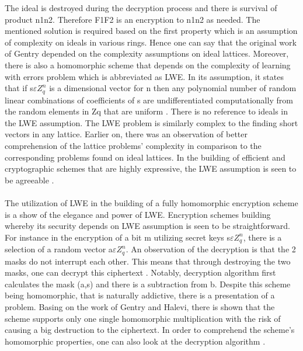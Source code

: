 The ideal is destroyed during the decryption process and there is survival of product n1n2. Therefore F1F2  is an encryption to  n1n2 as needed. The mentioned solution is required based on the first property which is an assumption of complexity on ideals in various rings. Hence one can say that the original work of Gentry depended on the complexity assumptions on ideal lattices. Moreover, there is also a homomorphic scheme that depends on the complexity of learning with errors problem which is abbreviated as LWE. In its assumption, it states that if s$\varepsilon Z_{q}^{n}$ is a dimensional vector for n then any polynomial number of random linear combinations of coefficients of s are undifferentiated computationally from the random elements in Zq that are uniform \cite{brakerski2011fully}. There is no reference to ideals in the LWE assumption. The LWE problem is similarly complex to the finding short vectors in any lattice. Earlier on, there was an observation of better comprehension of the lattice problems’ complexity in comparison to the corresponding problems found on ideal lattices. In the building of efficient and cryptographic schemes that are highly expressive, the LWE assumption is seen to be agreeable \cite{brakerski2011fully}. \\\\
The utilization of LWE in the building of a fully homomorphic encryption scheme is a show of the elegance and power of LWE. Encryption schemes building whereby its security depends on LWE assumption is seen to be straightforward. For instance in the encryption of a bit m utilizing secret keys s$\varepsilon Z_{q}^{n}$, there is a selection of a random vector a$\varepsilon Z_{q}^{n}$. An observation of the decryption is that the 2 masks do not interrupt each other. This means that through destroying the two masks, one can decrypt this ciphertext \cite{brakerski2011fully}. Notably, decryption algorithm first calculates the mask (a,s) and there is a subtraction from b. Despite this scheme being homomorphic, that is naturally addictive, there is a presentation of a problem. Basing on the work of Gentry and Halevi, there is shown that the scheme supports only one single homomorphic multiplication with the risk of causing a big destruction to the ciphertext. In order to comprehend the scheme’s homomorphic properties, one can also look at the decryption algorithm \cite{brakerski2011fully}.\\\\

